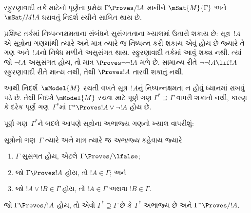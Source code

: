 \begingroup
\makeatletter{}\makeatother


\label{guunit:OLP-0506}


સ્ફુરણાવાદી તર્ક માટેનો પૂર્ણતા પ્રમેય $\Gamma \Proves/ !A$
માનીને $\mSat{M}{\Gamma}$ અને~$\mSat/{M}{!A}$ ધરાવતું
નિદર્શ રચીને સાબિત થાય છે.

પ્રશિષ્ટ તર્કમાં નિષ્પન્નક્ષમતાના સંબંધને સુસંગતતાના
ખ્યાલમાં ઉતારી શકાય છે: સૂત્ર~$!A$ એ
સૂત્રોના ગણમાંથી ત્યારે અને માત્ર ત્યારે જ
નિષ્પન્ન કરી શકાય એવું હોય છે જ્યારે તે ગણ અને~$!A$નો નિષેધ
મળીને અસુસંગત થાય. સ્ફુરણાવાદી તર્કમાં આવું શક્ય નથી.
ત્યાં જો $\lnot!A$ અસુસંગત હોય, તો માત્ર
$\Proves \lnot\lnot !A$ મળે છે. સામાન્ય રીતે
$\lnot\lnot!A \lif !A$ સ્ફુરણાવાદી રીતે માન્ય નથી,
તેથી $\Proves !A$ તારવી શકાતું નથી.

આથી નિદર્શ~$\mModel{M}$ રચતી વખતે સૂત્ર~$!A$નું
નિષ્પન્નક્ષમતા ન હોવું ધ્યાનમાં રાખવું પડે છે. તેથી નિદર્શ
$\mModel{M}$ રચવા માટે પૂર્ણ ગણ $\Gamma^* \supseteq \Gamma$
વાપરી શકાતો નથી, કારણ કે દરેક પૂર્ણ ગણ~$\Gamma^*$માં
$\Gamma^* \Proves !A \lor \lnot !A$ હોય છે.

પૂર્ણ ગણ~$\Gamma^*$ને બદલે આપણે સૂત્રોના અભાજ્ય ગણનો
ખ્યાલ વાપરીશું:

\begin{defn}
  સૂત્રોનો ગણ~$\Gamma$ ત્યારે અને માત્ર ત્યારે જ
  \emph{અભાજ્ય} કહેવાય જ્યારે
  \begin{enumerate}
  \item{} $\Gamma$ સુસંગત હોય, એટલે
    $\Gamma \Proves/ \lfalse$;
  \item{} જો $\Gamma \Proves !A$ હોય,
    તો $!A \in \Gamma$; અને
  \item{} જો $!A \lor !B \in \Gamma$
    હોય, તો $!A \in \Gamma$ અથવા $!B \in \Gamma$.
  \end{enumerate}
\end{defn}

\begin{lem}
   જો $\Gamma \Proves/ !A$ હોય,
  તો એવો $\Gamma^* \supseteq \Gamma$ છે કે $\Gamma^*$
  અભાજ્ય છે અને $\Gamma^* \Proves/ !A$.
\end{lem}

